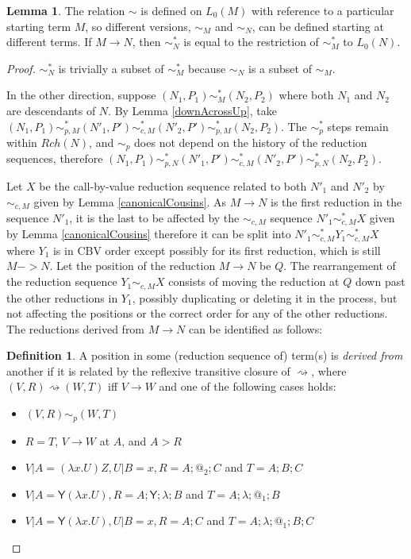 \documentclass{article}
\newcommand{\tY}{\textsf{Y}}
\theoremstyle{definition}
\newtheorem{definition}{Definition}
\theoremstyle{lemma}
\newtheorem{lemma}{Lemma}
\theoremstyle{remark}
\begin{document}
\begin{lemma}
The relation $\sim$ is defined on $L_0(M)$ with reference to a particular starting term $M$, so different versions, $\sim_M$ and $\sim_N$, can be defined starting at different terms. If $M \to N$, then $\sim^*_N$ is equal to the restriction of $\sim^*_M$ to $L_0(N)$.
\end{lemma} 
\begin{proof}
$\sim_N^*$ is trivially a subset of $\sim_M^*$ because $\sim_N$ is a subset of $\sim_M$.

In the other direction, suppose $(N_1, P_1) \sim_M^* (N_2, P_2)$ where both $N_1$ and $N_2$ are descendants of $N$. By Lemma \ref{downAcrossUp}, take $(N_1, P_1) \sim_{p,M}^* (N'_1, P') \sim_{c,M}^* (N'_2, P') \sim_{p,M}^* (N_2, P_2)$. The $\sim_p^*$ steps remain within $Rch(N)$, and $\sim_p$ does not depend on the history of the reduction sequences, therefore $(N_1, P_1) \sim_{p,N}^* (N'_1, P') \sim_{c,M}^* (N'_2, P') \sim_{p,N}^* (N_2, P_2)$.

Let $X$ be the call-by-value reduction sequence related to both $N'_1$ and $N'_2$ by $\sim_{c,M}$ given by Lemma \ref{canonicalCousins}. As $M \to N$ is the first reduction in the sequence $N'_1$, it is the last to be affected by the $\sim_{c,M}$ sequence $N'_1 \sim_{c,M}^* X$ given by Lemma \ref{canonicalCousins} therefore it can be split into $N'_1 \sim_{c,M}^* Y_1 \sim_{c,M}^* X$ where $Y_1$ is in CBV order except possibly for its first reduction, which is still $M -> N$. Let the position of the reduction $M \to N$ be $Q$.  The rearrangement of the reduction sequence $Y_1 \sim_{c,M} X$ consists of moving the reduction at $Q$ down past the other reductions in $Y_1$, possibly duplicating or deleting it in the process, but not affecting the positions or the correct order for any of the other reductions. The reductions derived from $M \to N$ can be identified as follows:

\begin{definition}
A position in some (reduction sequence of) term(s) is \emph{derived from} another if it is related by the reflexive transitive closure of $\rightsquigarrow$, where $(V,R) \rightsquigarrow (W,T)$ iff $V \to W$ and one of the following cases holds:
\begin{itemize}
    \item $(V,R) \sim_p (W,T)$
    \item $R = T$, $V \to W$ at $A$, and $A > R$
    \item $V | A = (\lambda x.U) Z, U | B = x, R = A;@_2;C$ and $T = A;B;C$
    \item $V | A = \tY (\lambda x.U), R = A;\tY;\lambda;B$ and $T = A;\lambda;@_1;B$
    \item $V | A = \tY (\lambda x.U), U | B = x, R = A;C$ and $T = A;\lambda;@_1;B;C$
\end{itemize}
\end{definition}


\end{proof}
\end{document}
